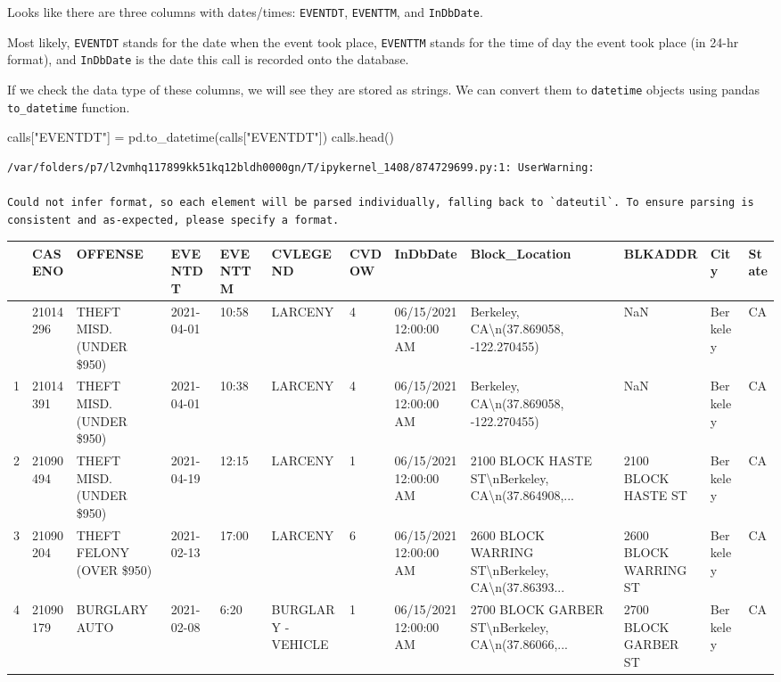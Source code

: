 \documentclass[
  letterpaper,
  DIV=11,
  numbers=noendperiod]{scrreprt}
\newenvironment{Shaded}{\begin{snugshade}}{\end{snugshade}}
\newcommand{\NormalTok}[1]{\textcolor[rgb]{0.00,0.23,0.31}{#1}}
\newcommand{\OperatorTok}[1]{\textcolor[rgb]{0.37,0.37,0.37}{#1}}
\newcommand{\StringTok}[1]{\textcolor[rgb]{0.13,0.47,0.30}{#1}}
\begin{document}
Looks like there are three columns with dates/times: \texttt{EVENTDT},
\texttt{EVENTTM}, and \texttt{InDbDate}.

Most likely, \texttt{EVENTDT} stands for the date when the event took
place, \texttt{EVENTTM} stands for the time of day the event took place
(in 24-hr format), and \texttt{InDbDate} is the date this call is
recorded onto the database.

If we check the data type of these columns, we will see they are stored
as strings. We can convert them to \texttt{datetime} objects using
pandas \texttt{to\_datetime} function.

\begin{Shaded}
\begin{Highlighting}[]
\NormalTok{calls[}\StringTok{"EVENTDT"}\NormalTok{] }\OperatorTok{=}\NormalTok{ pd.to\_datetime(calls[}\StringTok{"EVENTDT"}\NormalTok{])}
\NormalTok{calls.head()}
\end{Highlighting}
\end{Shaded}

\begin{verbatim}
/var/folders/p7/l2vmhq117899kk51kq12bldh0000gn/T/ipykernel_1408/874729699.py:1: UserWarning:

Could not infer format, so each element will be parsed individually, falling back to `dateutil`. To ensure parsing is consistent and as-expected, please specify a format.
\end{verbatim}

\begin{longtable}[]{@{}llllllllllll@{}}
\toprule\noalign{}
& CASENO & OFFENSE & EVENTDT & EVENTTM & CVLEGEND & CVDOW & InDbDate &
Block\_Location & BLKADDR & City & State \\
\midrule\noalign{}
\endhead
\bottomrule\noalign{}
\endlastfoot
0 & 21014296 & THEFT MISD. (UNDER \$950) & 2021-04-01 & 10:58 & LARCENY
& 4 & 06/15/2021 12:00:00 AM & Berkeley, CA\textbackslash n(37.869058,
-122.270455) & NaN & Berkeley & CA \\
1 & 21014391 & THEFT MISD. (UNDER \$950) & 2021-04-01 & 10:38 & LARCENY
& 4 & 06/15/2021 12:00:00 AM & Berkeley, CA\textbackslash n(37.869058,
-122.270455) & NaN & Berkeley & CA \\
2 & 21090494 & THEFT MISD. (UNDER \$950) & 2021-04-19 & 12:15 & LARCENY
& 1 & 06/15/2021 12:00:00 AM & 2100 BLOCK HASTE
ST\textbackslash nBerkeley, CA\textbackslash n(37.864908,... & 2100
BLOCK HASTE ST & Berkeley & CA \\
3 & 21090204 & THEFT FELONY (OVER \$950) & 2021-02-13 & 17:00 & LARCENY
& 6 & 06/15/2021 12:00:00 AM & 2600 BLOCK WARRING
ST\textbackslash nBerkeley, CA\textbackslash n(37.86393... & 2600 BLOCK
WARRING ST & Berkeley & CA \\
4 & 21090179 & BURGLARY AUTO & 2021-02-08 & 6:20 & BURGLARY - VEHICLE &
1 & 06/15/2021 12:00:00 AM & 2700 BLOCK GARBER
ST\textbackslash nBerkeley, CA\textbackslash n(37.86066,... & 2700 BLOCK
GARBER ST & Berkeley & CA \\
\end{longtable}
\end{document}
